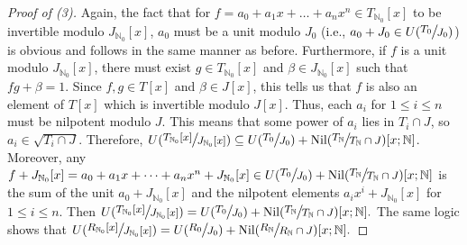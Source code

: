 \documentclass[12pt]{amsart}
\theoremstyle{definition}
\newcommand{\bN}{\mathbb N}
\newcommand{\bNo}{{{\mathbb N}_0}}
\newcommand{\quot}[2]{\large\sfrac{#1}{#2}\normalsize}
\newcommand{\Nil}{\textup{Nil}}
\begin{document}
\begin{proof}[Proof of (3)]
    Again, the fact that for $f=a_0+a_1x+\dots+a_nx^n\in T_{\bNo}[x]$ to be invertible modulo $J_{\bNo}[x]$, $a_0$ must be a unit modulo $J_0$ (i.e., $a_0+J_0\in U(\quot{T_0}{J_0})$) is obvious and follows in the same manner as before. Furthermore, if $f$ is a unit modulo $J_{\bNo}[x]$, there must exist $g\in T_{\bNo}[x]$ and $\beta\in J_{\bNo}[x]$ such that $fg+\beta=1$. Since $f,g\in T[x]$ and $\beta\in J[x]$, this tells us that $f$ is also an element of $T[x]$ which is invertible modulo $J[x]$. Thus, each $a_i$ for $1\leq i\leq n$ must be nilpotent modulo $J$. This means that some power of $a_i$ lies in $T_i\cap J$, so $a_i\in \sqrt{T_i\cap J}$. Therefore, $U(\quot{T_\bNo[x]}{J_\bNo[x]})\subseteq U(\quot{T_0}{J_0})+\Nil(\quot{T_\bN}{T_\bN\cap J})[x;\bN]$. Moreover, any $f+J_\bNo[x]=a_0+a_1x+\dots+a_nx^n+J_\bNo[x]\in U(\quot{T_0}{J_0})+\Nil(\quot{T_\bN}{T_\bN\cap J})[x;\bN]$ is the sum of the unit $a_0+J_\bNo[x]$ and the nilpotent elements $a_ix^i+J_\bNo[x]$ for $1\leq i\leq n$. Then $U(\quot{T_{\bNo}[x]}{J_{\bNo}[x]})=U(\quot{T_0}{J_0})+\Nil(\quot{T_\bN}{T_{\bN}\cap J})[x;\bN].$ The same logic shows that $U(\quot{R_{\bNo}[x]}{J_{\bNo}[x]})=U(\quot{R_0}{J_0})+\Nil(\quot{R_\bN}{R_{\bN}\cap J})[x;\bN].$
\end{proof}
\end{document}
